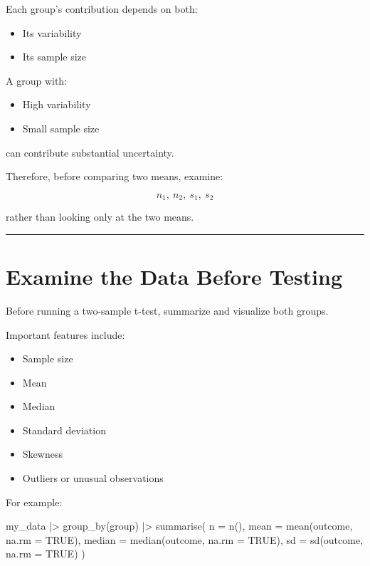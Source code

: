 \documentclass[
  letterpaper,
  DIV=11,
  numbers=noendperiod]{scrreprt}
\newenvironment{Shaded}{\begin{snugshade}}{\end{snugshade}}
\newcommand{\AttributeTok}[1]{\textcolor[rgb]{0.40,0.45,0.13}{#1}}
\newcommand{\ConstantTok}[1]{\textcolor[rgb]{0.56,0.35,0.01}{#1}}
\newcommand{\FunctionTok}[1]{\textcolor[rgb]{0.28,0.35,0.67}{#1}}
\newcommand{\NormalTok}[1]{\textcolor[rgb]{0.00,0.23,0.31}{#1}}
\newcommand{\SpecialCharTok}[1]{\textcolor[rgb]{0.37,0.37,0.37}{#1}}
\providecommand{\tightlist}{%
  \setlength{\itemsep}{0pt}\setlength{\parskip}{0pt}}
\begin{document}
Each group's contribution depends on both:

\begin{itemize}
\tightlist
\item
  Its variability
\item
  Its sample size
\end{itemize}

A group with:

\begin{itemize}
\tightlist
\item
  High variability
\item
  Small sample size
\end{itemize}

can contribute substantial uncertainty.

Therefore, before comparing two means, examine:

\[
n_1,\ n_2,\ s_1,\ s_2
\]

rather than looking only at the two means.

\begin{center}\rule{0.5\linewidth}{0.5pt}\end{center}


\chapter{Examine the Data Before
Testing}\label{examine-the-data-before-testing}

Before running a two-sample t-test, summarize and visualize both groups.

Important features include:

\begin{itemize}
\tightlist
\item
  Sample size
\item
  Mean
\item
  Median
\item
  Standard deviation
\item
  Skewness
\item
  Outliers or unusual observations
\end{itemize}

For example:

\begin{Shaded}
\begin{Highlighting}[]
\NormalTok{my\_data }\SpecialCharTok{|\textgreater{}}
    \FunctionTok{group\_by}\NormalTok{(group) }\SpecialCharTok{|\textgreater{}}
    \FunctionTok{summarise}\NormalTok{(}
        \AttributeTok{n =} \FunctionTok{n}\NormalTok{(),}
        \AttributeTok{mean =} \FunctionTok{mean}\NormalTok{(outcome, }\AttributeTok{na.rm =} \ConstantTok{TRUE}\NormalTok{),}
        \AttributeTok{median =} \FunctionTok{median}\NormalTok{(outcome, }\AttributeTok{na.rm =} \ConstantTok{TRUE}\NormalTok{),}
        \AttributeTok{sd =} \FunctionTok{sd}\NormalTok{(outcome, }\AttributeTok{na.rm =} \ConstantTok{TRUE}\NormalTok{)}
\NormalTok{    )}
\end{Highlighting}
\end{Shaded}
\end{document}

